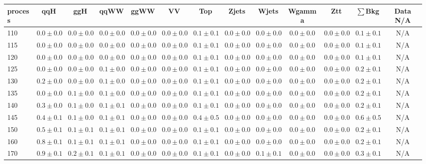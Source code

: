\begin{table}
{%
 \tiny
 \begin{center}
 \begin{tabular}{l | c c | c c c c c c c c  | c c}
 \hline
 process & qqH & ggH & qqWW & ggWW & VV & Top & Zjets & Wjets & Wgamma & Ztt & $\sum$Bkg & Data N/A \\
 \hline
110 & $0.0\pm0.0$ & $0.0\pm0.0$ & $0.0\pm0.0$ & $0.0\pm0.0$ & $0.0\pm0.0$ & $0.1\pm0.1$ & $0.0\pm0.0$ & $0.0\pm0.0$ & $0.0\pm0.0$ & $0.0\pm0.0$ & $0.1\pm0.1$ &  N/A \\
115 & $0.0\pm0.0$ & $0.0\pm0.0$ & $0.0\pm0.0$ & $0.0\pm0.0$ & $0.0\pm0.0$ & $0.1\pm0.1$ & $0.0\pm0.0$ & $0.0\pm0.0$ & $0.0\pm0.0$ & $0.0\pm0.0$ & $0.1\pm0.1$ &  N/A \\
120 & $0.0\pm0.0$ & $0.0\pm0.0$ & $0.0\pm0.0$ & $0.0\pm0.0$ & $0.0\pm0.0$ & $0.1\pm0.1$ & $0.0\pm0.0$ & $0.0\pm0.0$ & $0.0\pm0.0$ & $0.0\pm0.0$ & $0.1\pm0.1$ &  N/A \\
125 & $0.0\pm0.0$ & $0.0\pm0.0$ & $0.1\pm0.0$ & $0.0\pm0.0$ & $0.0\pm0.0$ & $0.1\pm0.1$ & $0.0\pm0.0$ & $0.0\pm0.0$ & $0.0\pm0.0$ & $0.0\pm0.0$ & $0.2\pm0.1$ &  N/A \\
130 & $0.2\pm0.0$ & $0.0\pm0.0$ & $0.1\pm0.0$ & $0.0\pm0.0$ & $0.0\pm0.0$ & $0.1\pm0.1$ & $0.0\pm0.0$ & $0.0\pm0.0$ & $0.0\pm0.0$ & $0.0\pm0.0$ & $0.2\pm0.1$ &  N/A \\
135 & $0.0\pm0.0$ & $0.1\pm0.0$ & $0.1\pm0.0$ & $0.0\pm0.0$ & $0.0\pm0.0$ & $0.1\pm0.1$ & $0.0\pm0.0$ & $0.0\pm0.0$ & $0.0\pm0.0$ & $0.0\pm0.0$ & $0.2\pm0.1$ &  N/A \\
140 & $0.3\pm0.0$ & $0.1\pm0.0$ & $0.1\pm0.1$ & $0.0\pm0.0$ & $0.0\pm0.0$ & $0.1\pm0.1$ & $0.0\pm0.0$ & $0.0\pm0.0$ & $0.0\pm0.0$ & $0.0\pm0.0$ & $0.2\pm0.1$ &  N/A \\
145 & $0.4\pm0.1$ & $0.1\pm0.0$ & $0.1\pm0.1$ & $0.0\pm0.0$ & $0.0\pm0.0$ & $0.4\pm0.5$ & $0.0\pm0.0$ & $0.0\pm0.0$ & $0.0\pm0.0$ & $0.0\pm0.0$ & $0.6\pm0.5$ &  N/A \\
150 & $0.5\pm0.1$ & $0.1\pm0.1$ & $0.1\pm0.1$ & $0.0\pm0.0$ & $0.0\pm0.0$ & $0.1\pm0.1$ & $0.0\pm0.0$ & $0.0\pm0.0$ & $0.0\pm0.0$ & $0.0\pm0.0$ & $0.2\pm0.1$ &  N/A \\
160 & $0.8\pm0.1$ & $0.1\pm0.1$ & $0.1\pm0.1$ & $0.0\pm0.0$ & $0.0\pm0.0$ & $0.1\pm0.1$ & $0.0\pm0.0$ & $0.0\pm0.0$ & $0.0\pm0.0$ & $0.0\pm0.0$ & $0.2\pm0.1$ &  N/A \\
170 & $0.9\pm0.1$ & $0.2\pm0.1$ & $0.1\pm0.1$ & $0.0\pm0.0$ & $0.0\pm0.0$ & $0.1\pm0.1$ & $0.0\pm0.0$ & $0.1\pm0.1$ & $0.0\pm0.0$ & $0.0\pm0.0$ & $0.3\pm0.1$ &  N/A \\

\end{tabular}
\end{center}}
\end{table}
